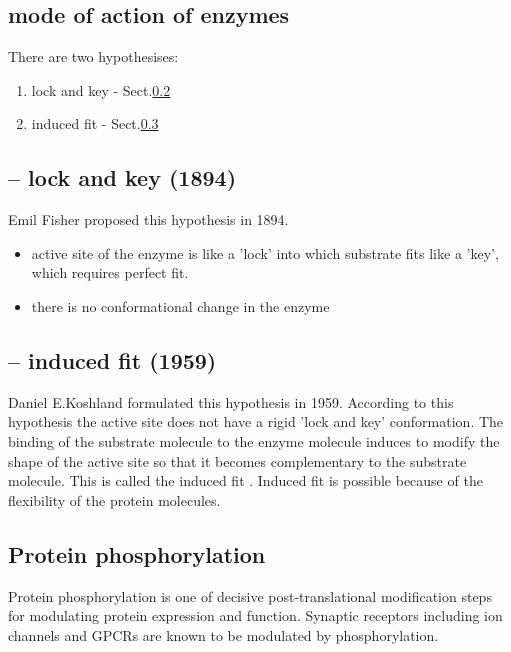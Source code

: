 \subsection{mode of action of enzymes}
\label{sec:enzyme-binding-mechanism}

There are two hypothesises:
\begin{enumerate}
  \item lock and key - Sect.\ref{sec:lock-and-key}
  
  \item induced fit - Sect.\ref{sec:induced-fit}
\end{enumerate}

\subsection{-- lock and key (1894)}
\label{sec:lock-and-key}

Emil Fisher proposed this hypothesis in 1894. 
\begin{itemize}
  \item  active site of the enzyme is like a 'lock' into which substrate fits
  like a 'key', which requires perfect fit.
  
  \item there is no conformational change in the enzyme
  
\end{itemize}

\subsection{-- induced fit (1959)}
\label{sec:induced-fit}

Daniel E.Koshland formulated this hypothesis in 1959. According to this
hypothesis the active site does not have a rigid 'lock and key' conformation.
The binding of the substrate molecule to the enzyme molecule induces to modify
the shape of the active site so that it becomes complementary to the substrate
molecule. This is called the induced fit . Induced fit is possible because of
the flexibility of the protein molecules.


\subsection{Protein phosphorylation}
\label{sec:phosphorylation}

Protein phosphorylation is one of decisive post-translational modification steps
for modulating protein expression and function.  Synaptic receptors including
ion channels and GPCRs are known to be modulated by phosphorylation.

